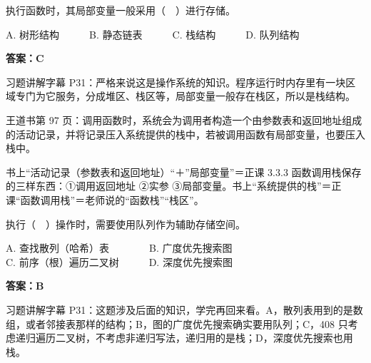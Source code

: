 \documentclass[10.5pt,a4paper,oneside]{article}
\newcommand{\hlred}[1]{\textcolor{wdred}{\bfseries #1}}
\begin{document}
\begin{questionbox}[09]

执行函数时，其局部变量一般采用（　）进行存储。

A. 树形结构　　　B. 静态链表　　　C. 栈结构　　　D. 队列结构

\end{questionbox}

\hlred{\textbf{答案：C}}

\begin{videobox}

习题讲解字幕
P31：严格来说这是操作系统的知识。程序运行时内存里有一块区域专门为它服务，分成堆区、栈区等，局部变量一般存在栈区，所以是栈结构。

\end{videobox}

\begin{jiexibox}

王道书第 97
页：调用函数时，系统会为调用者构造一个由参数表和返回地址组成的活动记录，并将记录压入系统提供的栈中，若被调用函数有局部变量，也要压入栈中。

\end{jiexibox}

\begin{defbox}[：名词统一]

书上“活动记录（参数表和返回地址）“＋”局部变量”＝正课 3.3.3
函数调用栈保存的三样东西：①调用返回地址 ②实参
③局部变量。书上“系统提供的栈”＝正课“函数调用栈”＝老师说的“函数栈”“栈区”。

\end{defbox}

\begin{questionbox}[10]

执行（　）操作时，需要使用队列作为辅助存储空间。

A. 查找散列（哈希）表　　　　B. 广度优先搜索图\\
C. 前序（根）遍历二叉树　　　D. 深度优先搜索图

\end{questionbox}

\hlred{\textbf{答案：B}}

\begin{videobox}

习题讲解字幕
P31：这题涉及后面的知识，学完再回来看。A，散列表用到的是数组，或者邻接表那样的结构；B，图的广度优先搜索确实要用队列；C，408
只考虑递归遍历二叉树，不考虑非递归写法，递归用的是栈；D，深度优先搜索也用栈。

\end{videobox}
\end{document}
